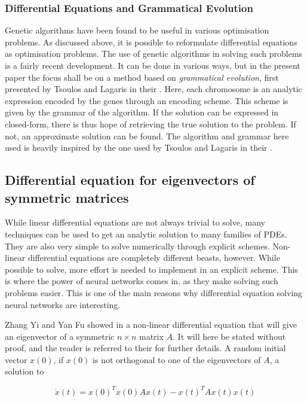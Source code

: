 \documentclass[multicolumn, 9pt]{extarticle}
\begin{document}
\subsubsection{Differential Equations and Grammatical Evolution}
Genetic algorithms have been found to be useful in various optimisation problems. As discussed above, it is possible to reformulate differential equations as optimisation problems. The use of genetic algorithms in solving such problems is a fairly recent development. It can be done in various ways, but in the present paper the focus shall be on a method based on \textit{grammatical evolution}, first presented by Tsoulos and Lagaris in their \cite{Lagaris}. Here, each chromosome is an analytic expression encoded by the genes through an encoding scheme. This scheme is given by the grammar of the algorithm. If the solution can be expressed in closed-form, there is thus hope of retrieving the true solution to the problem. If not, an approximate solution can be found. The algorithm and grammar here used is heavily inspired by the one used by Tsoulos and Lagaris in their  \cite{Lagaris}.

\subsection{Differential equation for eigenvectors of symmetric matrices}
While linear differential equations are not always trivial to solve, many techniques can be used to get an analytic solution to many families of PDEs. They are also very simple to solve numerically through explicit schemes. Non-linear differential equations are completely different beasts, however. While possible to solve, more effort is needed to implement in an explicit scheme. This is where the power of neural networks comes in, as they make solving such problems easier. This is one of the main reasons why differential equation solving neural networks are interesting.

Zhang Yi and Yan Fu showed in \cite{symmetric} a non-linear differential equation that will give an eigenvector of a symmetric $n\times n$ matrix $A$. It will here be stated without proof, and the reader is referred to their \cite{symmetric} for further details. A random initial vector $x(0)$, if $x(0)$ is not orthogonal to one of the eigenvectors of $A$, a solution to

\begin{equation}\label{eq:diff_sym}
	\dot{x}(t) = x(0)^Tx(0)Ax(t)-x(t)^TAx(t)x(t)
\end{equation}
\end{document}
